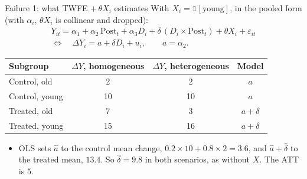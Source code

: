 \documentclass[
  11pt,
  ignorenonframetext,
  aspectratio=169,
]{beamer}
\providecommand{\tightlist}{%
  \setlength{\itemsep}{0pt}\setlength{\parskip}{0pt}}
\begin{document}
\begin{frame}{Failure 1: what TWFE \(+\,\theta X_i\) estimates}
\protect{}\label{failure-1-what-twfe-theta-x_i-estimates}
With \(X_i = \mathds{1}[\text{young}]\), in the pooled form (with
\(\alpha_i\), \(\theta X_i\) is collinear and dropped): \[
\begin{gathered}
Y_{it} = \alpha_1 + \alpha_2\,\text{Post}_t + \alpha_3 D_i + \delta\,(D_i \times \text{Post}_t) + \theta X_i + \varepsilon_{it} \\
\Longleftrightarrow\quad \Delta Y_i = a + \delta D_i + u_i, \qquad a = \alpha_2 .
\end{gathered}
\]

\begin{center}\small
\begin{tabular}{lccc}
\toprule
Subgroup & $\Delta Y$, homogeneous & $\Delta Y$, heterogeneous & Model \\
\midrule
Control, old & 2 & 2 & $a$ \\
Control, young & 10 & 10 & $a$ \\
Treated, old & 7 & 3 & $a + \delta$ \\
Treated, young & 15 & 16 & $a + \delta$ \\
\bottomrule
\end{tabular}
\end{center}

\begin{itemize}
\tightlist
\item
  OLS sets \(\hat a\) to the control mean change,
  \(0.2 \times 10 + 0.8 \times 2 = 3.6\), and \(\hat a + \hat\delta\) to
  the treated mean, \(13.4\). So \(\hat\delta = 9.8\) in both scenarios,
  as without \(X\). The ATT is \(5\).
\end{itemize}
\end{frame}
\end{document}
